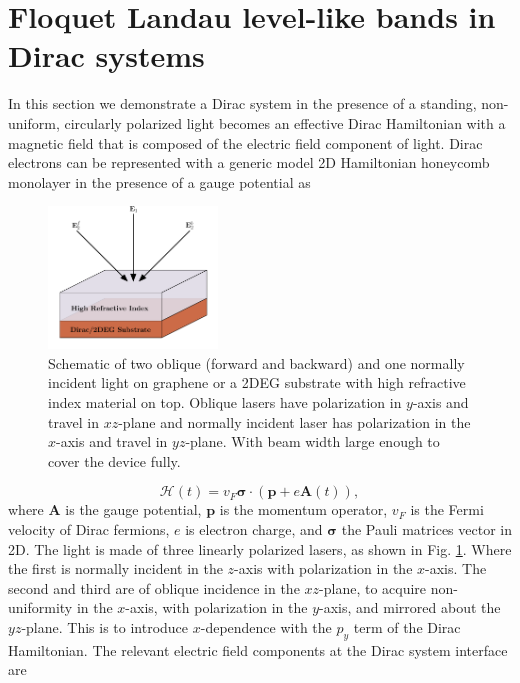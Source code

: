 \documentclass[aps,prb,twocolumn,showpacs,superscriptaddress]{revtex4-2}
\renewcommand{\vec}[1]{\mathbf{#1}}
\newcommand{\ham}{\mathcal{H}}
\begin{document}
\section{Floquet Landau level-like bands in Dirac systems}
In this section we demonstrate a Dirac system in the presence of a standing, non-uniform, circularly polarized light becomes an effective Dirac Hamiltonian with a magnetic field that is composed of the electric field component of light.
Dirac electrons can be represented with a generic model 2D Hamiltonian honeycomb monolayer in the presence of a gauge potential as

\begin{figure}[h]
  \includegraphics[width=0.4\textwidth]{./figures/fll-setup.pdf}
  \caption{Schematic of two oblique (forward and backward) and one normally incident light on graphene or a 2DEG substrate with high refractive index material on top. Oblique lasers have polarization in $y$-axis and travel in $xz$-plane and normally incident laser has polarization in the $x$-axis and travel in $yz$-plane. With beam width large enough to cover the device fully.}
  \label{fig:fll-setup}
\end{figure}

\begin{equation}\label{eq:HDirac}
  \ham(t) = v_{F} \bm{\sigma} \cdot \left(\vec{p} + e\vec{A}(t)\right),
\end{equation}
where $\vec{A}$ is the gauge potential, $\vec{p}$ is the momentum operator, $v_F$ is the Fermi velocity of Dirac fermions, $e$ is electron charge, and $\vec{\sigma}$ the Pauli matrices vector in 2D.
The light is made of three linearly polarized lasers, as shown in Fig. \ref{fig:fll-setup}.
Where the first is normally incident in the $z$-axis with polarization in the $x$-axis.
The second and third are of oblique incidence in the $xz$-plane, to acquire non-uniformity in the $x$-axis, with polarization in the $y$-axis, and mirrored about the $yz$-plane.
This is to introduce $x$-dependence with the $p_y$ term of the Dirac Hamiltonian.
The relevant electric field components at the Dirac system interface are
\end{document}
